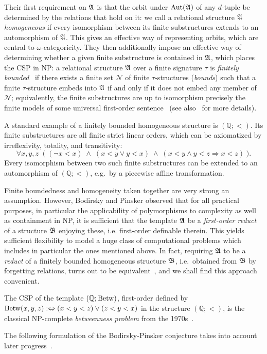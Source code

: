  
Their first requirement on $\mathfrak{A}$ is that the orbit under $\mathrm{Aut}(\mathfrak{A})$ of any $d$-tuple  be determined by the relations that hold on it: we call a relational structure $\mathfrak{A}$ \emph{homogeneous} if every isomorphism between its finite substructures  extends to an automorphism of $\mathfrak{A}$.
%
This gives an effective way of representing orbits, which are central to $\omega$-categoricity.
%
They then additionally impose an effective way of determining whether a given finite substructure is contained in $\mathfrak{A}$, which places the CSP in NP:
%
a relational structure $\mathfrak{A}$ over a finite signature $\tau$ is \emph{finitely bounded}~\cite{macpherson2011survey} if there exists a finite set $\mathcal{N}$ of finite $\tau$-structures (\emph{bounds}) such that a finite $\tau$-structure embeds into $\mathfrak{A}$ if and only if it does not embed any member of $\mathcal{N}$;
%
equivalently,  the finite substructures are up to isomorphism precisely the finite models of some universal first-order sentence~\cite[Lemma~2.3.14]{bodirsky2021complexity} (see also~\cite{Bodirsky-Mottet,rydval_arxiv} for more details).
\begin{example} \label{ex:properties_of_q}
    A standard example of a finitely bounded homogeneous structure is $(\mathbb{Q};<)$. Its finite substructures are all finite strict linear orders, which can be axiomatized by irreflexivity, totality, and transitivity:
    \[
    \forall x,y,z\;\; \big(\; (\neg x<x)  \;\wedge\; ( x<y \vee y<x) \;\wedge\; (x<y \wedge y<z \Rightarrow x<z) \;\big).
    \]
    Every isomorphism between two such finite substructures can be extended to an automorphism of $(\mathbb{Q};<)$, e.g.~by a piecewise affine transformation.
\end{example}

Finite boundedness and homogeneity taken together are very strong an assumption. However,  Bodirsky and Pinsker observed that for all practical purposes, in particular the applicability of polymorphisms to complexity as well as containment in NP, it is sufficient that the template $\mathfrak{A}$  be a \emph{first-order reduct} of a structure $\mathfrak{B}$ enjoying these, i.e.  first-order definable therein. 
%
 This yields  sufficient flexibility to model a huge class of computational problems which includes in particular the ones mentioned above.  In fact, requiring $\mathfrak{A}$ to be a \emph{reduct} of a finitely bounded homogeneous structure $\mathfrak{B}$, i.e.~obtained from $\mathfrak{B}$ by forgetting relations,  turns out to be equivalent~\cite[Proposition 7]{baader_rydval}, and we shall find this  approach convenient. 
 \begin{example} \label{ex:properties_of_q1} The CSP of the template $(\mathbb Q;\operatorname{Betw})$, first-order defined by $\operatorname{Betw}(x,y,z):\Leftrightarrow (x<y<z)\vee (z<y<x)$ in the structure $(\mathbb Q;<)$, is the classical NP-complete \emph{betweenness problem} from the 1970s~\cite{opatrny}. 
 \end{example}
 The following formulation of the Bodirsky-Pinsker conjecture takes into account later progress~\cite{barto2018wonderland,barto_pinsker_proc,barto_pinsker_journal,barto2019equations}.
   


